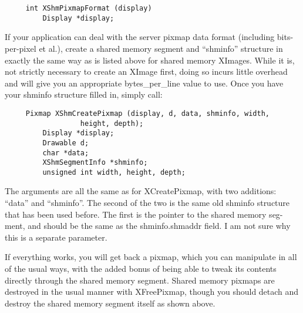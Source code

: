 \documentclass{article}
\begin{document}
\begin{verbatim}
     int XShmPixmapFormat (display)
	     Display *display;
\end{verbatim}

If your application can deal with the server pixmap data
format (including bits-per-pixel et al.), create a shared
memory segment and ``shminfo'' structure in exactly the same
way as is listed above for shared memory XImages.  While it
is, not strictly necessary to create an XImage first, doing
so incurs little overhead and will give you an appropriate
bytes\_per\_line value to use.
Once you have your shminfo structure filled in, simply call:

\begin{verbatim}
     Pixmap XShmCreatePixmap (display, d, data, shminfo, width,
			      height, depth);
	     Display *display;
	     Drawable d;
	     char *data;
	     XShmSegmentInfo *shminfo;
	     unsigned int width, height, depth;
\end{verbatim}

The arguments are all the same as for XCreatePixmap, with
two additions: ``data'' and ``shminfo''.  The second of the
two is the same old shminfo structure that has been used
before.	 The first is the pointer to the shared memory seg-
ment, and should be the same as the shminfo.shmaddr field.
I am not sure why this is a separate parameter.

If everything works, you will get back a pixmap, which you
can manipulate in all of the usual ways, with the added
bonus of being able to tweak its contents directly through
the shared memory segment.  Shared memory pixmaps are
destroyed in the usual manner with XFreePixmap, though you
should detach and destroy the shared memory segment itself
as shown above.
\end{document}
